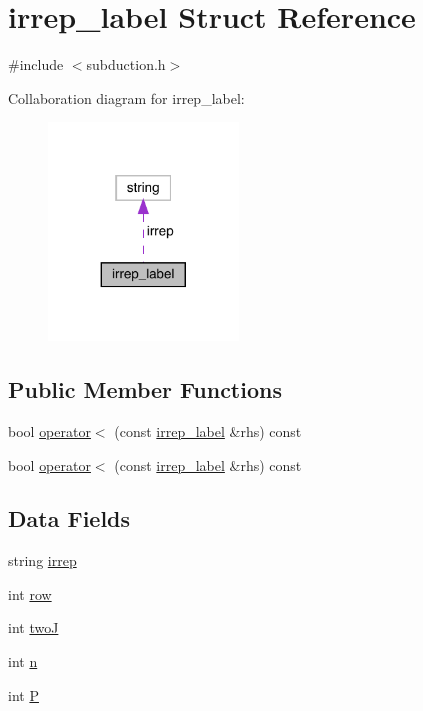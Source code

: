 \hypertarget{structirrep__label}{}\section{irrep\+\_\+label Struct Reference}
\label{structirrep__label}


{\ttfamily \#include $<$subduction.\+h$>$}



Collaboration diagram for irrep\+\_\+label\+:\nopagebreak
\begin{figure}[H]
\begin{center}
\leavevmode
\includegraphics[width=143pt]{df/d1a/structirrep__label__coll__graph}
\end{center}
\end{figure}
\subsection*{Public Member Functions}
\begin{DoxyCompactItemize}
\item 
bool \mbox{\hyperlink{structirrep__label_aed7f86acf9c55f4007a313bbd72485e1}{operator$<$}} (const \mbox{\hyperlink{structirrep__label}{irrep\+\_\+label}} \&rhs) const
\item 
bool \mbox{\hyperlink{structirrep__label_aed7f86acf9c55f4007a313bbd72485e1}{operator$<$}} (const \mbox{\hyperlink{structirrep__label}{irrep\+\_\+label}} \&rhs) const
\end{DoxyCompactItemize}
\subsection*{Data Fields}
\begin{DoxyCompactItemize}
\item 
string \mbox{\hyperlink{structirrep__label_a21e18e087b0a2a1d22886c0244d7e7e6}{irrep}}
\item 
int \mbox{\hyperlink{structirrep__label_a3e47b0519d5ae65e48b1e3fe509bcc13}{row}}
\item 
int \mbox{\hyperlink{structirrep__label_a2815db2b707875ae496bdbfd52d3c240}{twoJ}}
\item 
int \mbox{\hyperlink{structirrep__label_a6f7203722a797aa0fb81e1e4a7370ad8}{n}}
\item 
int \mbox{\hyperlink{structirrep__label_a87f13a9fa6fc452cd31cfbc8cbc5197d}{P}}
\end{DoxyCompactItemize}


